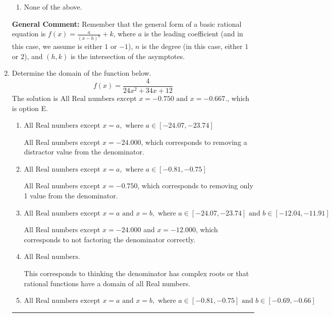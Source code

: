 \documentclass{extbook}[14pt]
\newcommand{\litem}[1]{\item #1

\rule{\textwidth}{0.4pt}}
\begin{document}
\begin{enumerate}
{\begin{enumerate}[label=\Alph*.]
\item None of the above.\end{enumerate}
\textbf{General Comment:} Remember that the general form of a basic rational equation is $ f(x) = \frac{a}{(x-h)^n} + k$, where $a$ is the leading coefficient (and in this case, we assume is either $1$ or $-1$), $n$ is the degree (in this case, either $1$ or $2$), and $(h, k)$ is the intersection of the asymptotes.
}
\litem{
Determine the domain of the function below.
\[ f(x) = \frac{4}{24x^{2} +34 x + 12} \]The solution is \( \text{All Real numbers except } x = -0.750 \text{ and } x = -0.667. \), which is option E.\begin{enumerate}[label=\Alph*.]
\item \( \text{All Real numbers except } x = a, \text{ where } a \in [-24.07, -23.74] \)

All Real numbers except $x = -24.000$, which corresponds to removing a distractor value from the denominator.
\item \( \text{All Real numbers except } x = a, \text{ where } a \in [-0.81, -0.75] \)

All Real numbers except $x = -0.750$, which corresponds to removing only 1 value from the denominator.
\item \( \text{All Real numbers except } x = a \text{ and } x = b, \text{ where } a \in [-24.07, -23.74] \text{ and } b \in [-12.04, -11.91] \)

All Real numbers except $x = -24.000$ and $x = -12.000$, which corresponds to not factoring the denominator correctly.
\item \( \text{All Real numbers.} \)

This corresponds to thinking the denominator has complex roots or that rational functions have a domain of all Real numbers.
\item \( \text{All Real numbers except } x = a \text{ and } x = b, \text{ where } a \in [-0.81, -0.75] \text{ and } b \in [-0.69, -0.66] \)


\end{enumerate}}
\end{enumerate}
\end{document}
